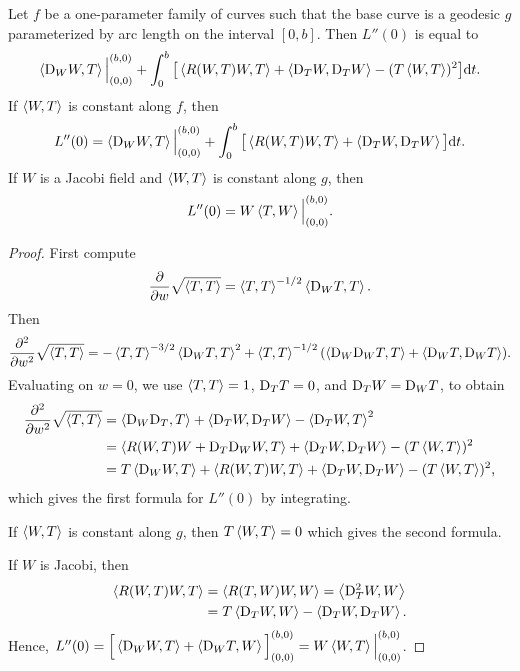 \documentclass[../main]{subfiles}
\begin{document}
\begin{theorem} \label{thm:ch10.2.6}
    Let $f$ be a one-parameter family of curves such that the base curve is a geodesic $g$ parameterized by arc length on the interval $[0,b]$. Then $L''(0)$ is equal to
    \[ \left\langle\mathrm{D}_W W,T\right\rangle\Big|_{(0,0)}^{(b,0)} + \int_0^b \big[\left\langle R(W, T)W,T\right\rangle + \left\langle\mathrm{D}_T W,\mathrm{D}_T W\right\rangle - (T\left\langle W,T\right\rangle)^2\big] \mathrm{d}t\text{.} \]
    If $\left\langle W,T\right\rangle$ is constant along $f$, then
    \[ L''(0) = \left\langle\mathrm{D}_W W,T\right\rangle\Big|_{(0,0)}^{(b,0)} + \int_0^b \big[\left\langle R(W, T)W,T\right\rangle + \left\langle\mathrm{D}_T W,\mathrm{D}_T W\right\rangle\big] \mathrm{d}t\text{.} \]
    If $W$ is a Jacobi field and $\left\langle W,T\right\rangle$ is constant along $g$, then
    \[ L''(0) = W\left\langle T,W\right\rangle\Big|_{(0,0)}^{(b,0)}\text{.} \]
\end{theorem}

\begin{proof}
    First compute \[\dfrac{\partial }{\partial w}\sqrt{\left\langle T,T\right\rangle} = \left\langle T,T\right\rangle^{-1/2}\left\langle\mathrm{D}_W T,T\right\rangle.\] Then
    \[
        \frac{\partial^2}{\partial w^2}\sqrt{\left\langle T,T\right\rangle} = -\left\langle T,T\right\rangle^{-3/2}\left\langle\mathrm{D}_W T,T\right\rangle^2 
        + \left\langle T,T\right\rangle^{-1/2}(\left\langle\mathrm{D}_W \mathrm{D}_W T,T\right\rangle  + \left\langle\mathrm{D}_W T,\mathrm{D}_W T\right\rangle).
    \]%
    Evaluating on $w = 0$, we use $\left\langle T,T\right\rangle = 1$, $\mathrm{D}_T T = 0$, and $\mathrm{D}_T W = \mathrm{D}_W T$, to obtain 
    \begin{align*}
        \frac{\partial^2}{\partial w^2} \sqrt{\left\langle T,T\right\rangle} &= \left\langle\mathrm{D}_W \mathrm{D}_T,T\right\rangle + \left\langle\mathrm{D}_T W,\mathrm{D}_T W\right\rangle - \left\langle\mathrm{D}_T W,T\right\rangle^2 \\
        &= \left\langle R(W, T)W+\mathrm{D}_T\mathrm{D}_WW,T\right\rangle + \left\langle\mathrm{D}_T W,\mathrm{D}_T W\right\rangle - (T\left\langle W,T\right\rangle)^2 \\
        &= T\left\langle\mathrm{D}_W W,T\right\rangle + \left\langle R(W, T)W,T\right\rangle + \left\langle\mathrm{D}_T W,\mathrm{D}_T W\right\rangle - (T\left\langle W,T\right\rangle)^2\text{,}
    \end{align*}%
    which gives the first formula for $L''(0)$ by integrating.

    If $\left\langle W,T\right\rangle$ is constant along $g$, then $T\left\langle W,T\right\rangle = 0$ which gives the second formula.

    If $W$ is Jacobi, then
    \begin{align*}
        \left\langle R(W, T)W,T\right\rangle &= \left\langle R(T, W)W,W\right\rangle = \left\langle\mathrm{D}_T^2 W,W\right\rangle \\
        &= T\left\langle\mathrm{D}_T W,W\right\rangle - \left\langle\mathrm{D}_T W,\mathrm{D}_T W\right\rangle\text{.}
    \end{align*}%
    Hence, $L''(0) = \Big[\left\langle\mathrm{D}_W W,T\right\rangle + \left\langle\mathrm{D}_W T ,W\right\rangle\Big]_{(0,0)}^{(b,0)} = W\left\langle W,T\right\rangle\Big|_{(0,0)}^{(b,0)}$.
\end{proof}
\end{document}
